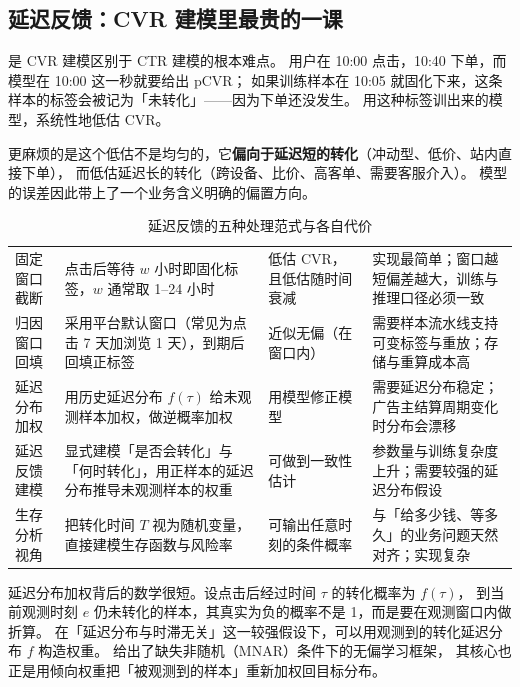 \subsection{延迟反馈：CVR 建模里最贵的一课}

 是 CVR 建模区别于 CTR 建模的根本难点。
用户在 10:00 点击，10:40 下单，而模型在 10:00 这一秒就要给出 pCVR；
如果训练样本在 10:05 就固化下来，这条样本的标签会被记为「未转化」——因为下单还没发生。
用这种标签训出来的模型，系统性地低估 CVR。

更麻烦的是这个低估不是均匀的，它\textbf{偏向于延迟短的转化}（冲动型、低价、站内直接下单），
而低估延迟长的转化（跨设备、比价、高客单、需要客服介入）。
模型的误差因此带上了一个业务含义明确的偏置方向。

\begin{table}[htbp]
\centering
\caption{延迟反馈的五种处理范式与各自代价}
\label{tab:delay-feedback}
\small
\begin{tabularx}{\linewidth}{L{2.6cm} L{4.0cm} L{1.8cm} Y}
\toprule
{} &  &  &  \\
\midrule
固定窗口截断 & 点击后等待 $w$ 小时即固化标签，$w$ 通常取 1--24 小时 &
低估 CVR，且低估随时间衰减 & 实现最简单；窗口越短偏差越大，训练与推理口径必须一致 \\
\addlinespace
归因窗口回填 & 采用平台默认窗口（常见为点击 7 天加浏览 1 天），到期后回填正标签 &
近似无偏（在窗口内） & 需要样本流水线支持可变标签与重放；存储与重算成本高 \\
\addlinespace
延迟分布加权 & 用历史延迟分布 $f(\tau)$ 给未观测样本加权，做逆概率加权 &
用模型修正模型 & 需要延迟分布稳定；广告主结算周期变化时分布会漂移 \\
\addlinespace
延迟反馈建模 & 显式建模「是否会转化」与「何时转化」，用正样本的延迟分布推导未观测样本的权重 &
可做到一致性估计 & 参数量与训练复杂度上升；需要较强的延迟分布假设 \\
\addlinespace
生存分析视角 & 把转化时间 $T$ 视为随机变量，直接建模生存函数与风险率 &
可输出任意时刻的条件概率 & 与「给多少钱、等多久」的业务问题天然对齐；实现复杂 \\
\bottomrule
\end{tabularx}
\end{table}

延迟分布加权背后的数学很短。设点击后经过时间 $\tau$ 的转化概率为 $f(\tau)$，
到当前观测时刻 $e$ 仍未转化的样本，其真实为负的概率不是 1，而是要在观测窗口内做折算。
在「延迟分布与时滞无关」这一较强假设下，可以用观测到的转化延迟分布 $f$ 构造权重。
\cite{saito2020doubly} 给出了缺失非随机（MNAR）条件下的无偏学习框架，
其核心也正是用倾向权重把「被观测到的样本」重新加权回目标分布。


